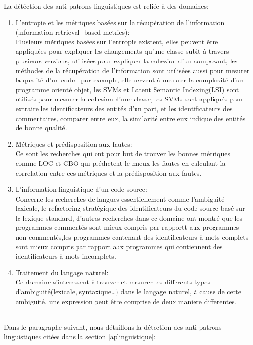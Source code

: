 La détéction des anti-patrons linguistiques est reliée à des domaines\cite{arnaoudova2016linguistic}:
\begin{enumerate}


\item L’entropie et les métriques basées sur la récupération de l’information (information retrieval -based metrics):\\ Plusieurs métriques basées sur l’entropie existent, elles peuvent être appliquées pour expliquer les changements qu’une classe subit à travers plusieurs versions, utilisées pour expliquer la cohesion d’un composant, les méthodes de  la récupération de l’information sont utilisées aussi pour mesurer la qualité d’un code , par exemple, elle servent à mesurer la complexité d’un programme orienté objet, les SVMs et Latent Semantic Indexing(LSI) sont utilisés pour mesurer la cohesion d’une classe, les SVMs sont appliqués pour extraire les identificateurs des entités d’un part, et les identificateurs des commentaires, comparer entre eux, la similarité entre eux indique des entités de bonne qualité.
\item Métriques et prédisposition aux fautes:\\
Ce sont les recherches qui ont pour but de trouver les bonnes métriques comme LOC et CBO qui prédictent le mieux les fautes en calculant la correlation entre ces métriques et la prédisposition aux fautes.
\item L’information linguistique d’un code source:\\
Concerne les recherches de langues essentiellement comme l’ambiguité lexicale, le refactoring stratégique des identificateurs du code source basé sur le lexique standard, d’autres recherches dans ce domaine ont montré que les programmes commentés sont mieux compris par rapportt aux programmes non commentés,les programmes contenant des identificateurs à mots complets sont mieux compris par rapport aux programmes qui contiennent des identificateurs à mots incomplets.
\item Traitement du langage naturel:\\
Ce domaine s’interessent à trouver et mesurer les differents types d’ambiguité(lexicale, syntaxique…) dans le langage naturel, à cause de cette ambiguité, une expression peut être comprise de deux maniere differentes.
\end{enumerate}
\\
\newline
Dans le paragraphe suivant, nous détaillons la détection des anti-patrons linguistiques citées dans la section \ref{aplinguistique}\cite{arnaoudova2016linguistic}:\\
\renewcommand{\thesubsection}{\thesection.\alph{subsection}}
